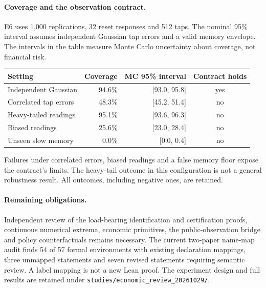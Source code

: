 \paragraph{Coverage and the observation contract.} E6 uses 1,000 replications,
32 reset responses and 512 taps. The nominal 95\% interval assumes independent
Gaussian tap errors and a valid memory envelope. The intervals in the table
measure Monte Carlo uncertainty about coverage, not financial risk.
\begin{center}\small
\begin{tabular}{lrrc}
\toprule
Setting & Coverage & MC 95\% interval & Contract holds\\
\midrule
Independent Gaussian & 94.6\% & [93.0, 95.8] & yes\\
Correlated tap errors & 48.3\% & [45.2, 51.4] & no\\
Heavy-tailed readings & 95.1\% & [93.6, 96.3] & no\\
Biased readings & 25.6\% & [23.0, 28.4] & no\\
Unseen slow memory & 0.0\% & [0.0, 0.4] & no\\
\bottomrule
\end{tabular}
\end{center}
Failures under correlated errors, biased readings and a false memory floor expose
the contract's limits. The heavy-tail outcome in this configuration is not a
general robustness result. All outcomes, including negative ones, are retained.

\paragraph{Remaining obligations.} Independent review of the load-bearing
identification and certification proofs, continuous numerical extrema, economic
primitives, the public-observation bridge and policy counterfactuals remains
necessary. The current two-paper name-map audit finds 54 of 57 formal environments
with existing declaration mappings, three unmapped statements and seven revised
statements requiring semantic review. A label mapping is not a new Lean proof.
The experiment design and full results are retained under
\texttt{studies/economic\_review\_20261029/}.
